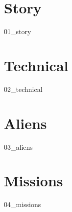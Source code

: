 \chapter{Story}
{01_story}

\chapter{Technical}
{02_technical}

\chapter{Aliens}
{03_aliens}

\chapter{Missions}
{04_missions}